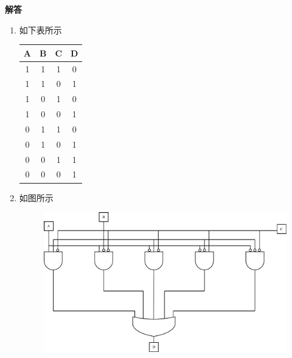 \documentclass[10pt,a4paper,UTF8]{ctexart}
\newenvironment{solution}{\par\noindent\textbf{解答}\ }{\par}
\begin{document}
\begin{solution}
	\begin{enumerate}[(1)]
		\item 如下表所示
		\begin{table}[H]
			\centering
			\begin{tabular}{|c|c|c|c|}
			\hline
			A & B & C & D \\ \hline
			1 & 1 & 1 & 0 \\ \hline
			1 & 1 & 0 & 1 \\ \hline
			1 & 0 & 1 & 0 \\ \hline
			1 & 0 & 0 & 1 \\ \hline
			0 & 1 & 1 & 0 \\ \hline
			0 & 1 & 0 & 1 \\ \hline
			0 & 0 & 1 & 1 \\ \hline
			0 & 0 & 0 & 1 \\ \hline
			\end{tabular}
		\end{table}
		\item 如图所示\begin{figure}[H]
			\centering
			\includegraphics[scale=0.4]{img/7.2.pdf}
		\end{figure}
	\end{enumerate}
	

\end{solution}
\end{document}
